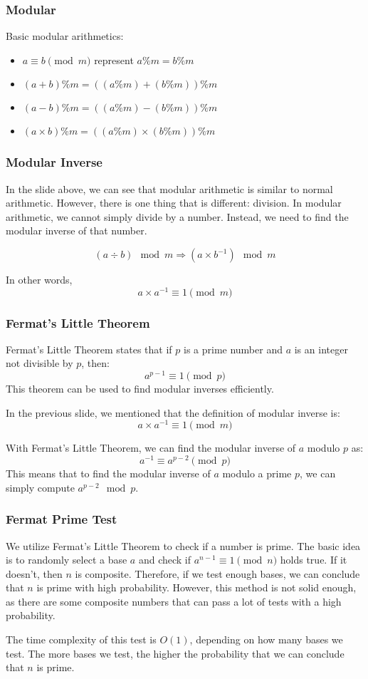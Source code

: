 \documentclass[xcolor=dvipsnames]{beamer}
\begin{document}
    \begin{frame}
        \frametitle{Modular}
        Basic modular arithmetics:
        \begin{itemize}
            \item $a\equiv b \pmod{m}$ represent $a\%m=b\%m$ 
            \item $(a+b)\% m = ((a\% m) + (b\% m))\% m$
            \item $(a-b)\% m = ((a\% m) - (b\% m))\% m$
            \item $(a\times b)\% m = ((a\% m) \times (b\% m))\% m$
        \end{itemize}

    \end{frame}
    \begin{frame}
        \frametitle{Modular Inverse}
        In the slide above, we can see that modular arithmetic is similar to normal arithmetic. However, there is one thing that is different: division.
        In modular arithmetic, we cannot simply divide by a number. Instead, we need to find the modular inverse of that number.

        $$
        (a\div b)\mod m\Rightarrow (a\times b^{-1})\mod m
        $$

        In other words, 
        $$
        a\times a^{-1} \equiv 1 \pmod{m}
        $$
    \end{frame}

    \begin{frame}
        \frametitle{Fermat's Little Theorem}
        Fermat's Little Theorem states that if $p$ is a prime number and $a$ is an integer not divisible by $p$, then:
        $$
        a^{p-1} \equiv 1 \pmod{p}
        $$
        This theorem can be used to find modular inverses efficiently.

        In the previous slide, we mentioned that the definition of modular inverse is:
        $$
        a\times a^{-1} \equiv 1 \pmod{m}
        $$

        With Fermat's Little Theorem, we can find the modular inverse of $a$ modulo $p$ as:
        $$
        a^{-1} \equiv a^{p-2} \pmod{p}
        $$
        This means that to find the modular inverse of $a$ modulo a prime $p$, we can simply compute $a^{p-2} \mod p$.
    \end{frame}

    \begin{frame}[fragile]
        \frametitle{Fermat Prime Test}
        We utilize Fermat's Little Theorem to check if a number is prime. The basic idea is to randomly select a base $a$ and check if $a^{n-1} \equiv 1 \pmod{n}$ holds true. If it doesn't, then $n$ is composite. Therefore, if we test enough bases, we can conclude that $n$ is prime with high probability. However, this method is not solid enough, as there are some composite numbers that can pass a lot of tests with a high probability.

        The time complexity of this test is $O(1)$, depending on how many bases we test. The more bases we test, the higher the probability that we can conclude that $n$ is prime.
    \end{frame}
\end{document}

